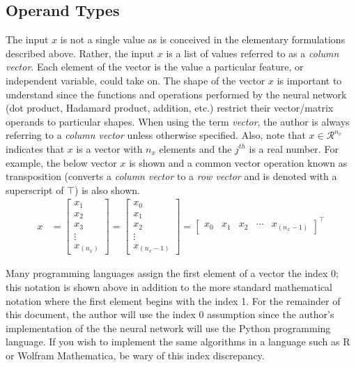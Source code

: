 \documentclass{article}
\begin{document}
\subsection{Operand Types}

The input $x$ is not a single value as is conceived in the elementary
formulations described above. Rather, the input $x$ is a list of
values referred to as a \textit{column vector}. Each element of the vector
is the value a particular feature, or independent variable, could take on.
The shape of the vector $x$ is important to understand since the functions and operations
performed by the neural network (dot product, Hadamard product, addition, etc.)
restrict their vector/matrix operands to particular shapes. When using the term
\textit{vector}, the author is always referring to a \textit{column vector}
unless otherwise specified. Also, note that $x \in \mathcal{R}^{n_x}$ indicates
that $x$ is a vector with $n_x$ elements and the $j^{th}$ is a real number.
For example, the below vector $x$ is shown and a common vector operation
known as transposition (converts a \textit{column vector} to a
\textit{row vector} and is denoted with a superscript of $\top$) is also shown.
\begin{align}
	x & = \begin{bmatrix}
		x_{1}  \\
		x_{2}  \\
		x_{3}  \\
		\vdots \\
		x_{(n_x)}
	\end{bmatrix}
	=
	\begin{bmatrix}
		x_{0}  \\
		x_{1}  \\
		x_{2}  \\
		\vdots \\
		x_{(n_{x}-1)}
	\end{bmatrix}
	=
	\begin{bmatrix}
		x_{0} & x_{1} & x_{2} & \cdots & x_{(n_{x}-1)}
	\end{bmatrix}^\top
\end{align}

Many programming languages assign the first element of a vector the index
0; this notation is shown above in addition to the more standard
mathematical notation where the first element begins with the index 1.
For the remainder of this document, the author will use the index 0 assumption
since the author's implementation of the the neural network will use the Python
programming language. If you wish to implement the same algorithms in a language
such as R or Wolfram Mathematica, be wary of this index discrepancy.
\end{document}
